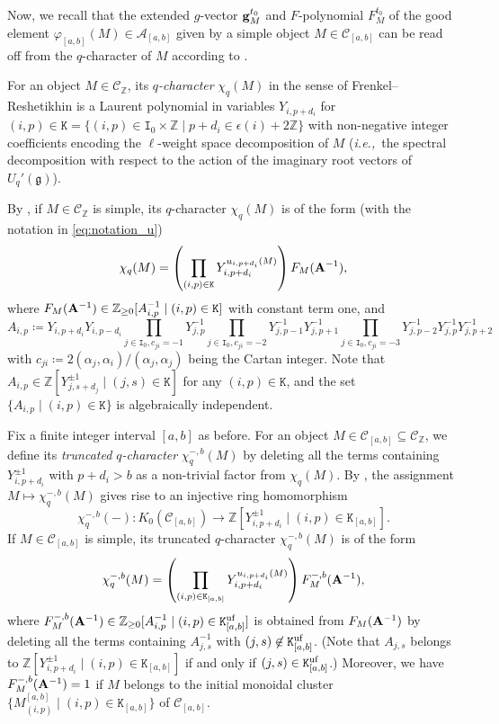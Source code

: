 \documentclass[12pt]{amsart}
\theoremstyle{definition}
\theoremstyle{remark}
\numberwithin{equation}{section}
\newcommand{\ie}{\textit{i.e.,}\ }
\begin{document}
Now, we recall that the extended $g$-vector ${\bf g}_M^{t_0}$ and $F$-polynomial $F_M^{t_0}$ of the good element $\varphi_{[a,b]}(M)\in \mathcal A_{[a,b]}$ given by a simple object $M\in\mathcal{C}_{[a,b]}$ can be read off from the $q$-character of $M$ according to \cite{HL16}.

For an object $M\in\mathcal C_{\mathbb Z}$, its {\em $q$-character} $\chi_q(M)$ in the sense of Frenkel--Reshetikhin \cite{FR99} is a Laurent polynomial in variables $Y_{i,p+d_i}$ for $(i,p)\in \mathtt K=\{(i,p)\in \mathtt{I}_0\times \mathbb Z\mid p+d_i\in \epsilon(i)+2\mathbb{Z}\}$
with non-negative integer coefficients encoding the $\ell$-weight space decomposition of $M$ (\ie the spectral decomposition with respect to the action of the imaginary root vectors of $U_q'(\mathfrak{g})$).

By \cite[Lemma 3.8]{HL16}, if $M \in \mathcal{C}_{\mathbb Z}$ is simple, its $q$-character $\chi_q(M)$ is of the form (with the notation in \eqref{eq:notation_u})
\[ \chi_q(M) = \left( \prod_{(i,p) \in \mathtt K} Y_{i,p+d_i}^{u_{i,p+d_i}(M)} \right) F_M({\bf A}^{-1}),\]
where $F_M({\bf A}^{-1}) \in \mathbb{Z}_{\ge 0}[A_{i,p}^{-1} \mid (i,p) \in \mathtt{K}]$ with constant term one, and
\[ A_{i,p} \coloneqq Y_{i,p+d_i}Y_{i,p-d_i} \prod_{j \in \mathtt{I}_0, c_{ji}=-1} Y_{j,p}^{-1} \prod_{j \in \mathtt{I}_0, c_{ji}=-2} Y_{j,p-1}^{-1}Y_{j,p+1}^{-1} \prod_{j \in \mathtt{I}_0, c_{ji}=-3}Y_{j,p-2}^{-1}Y_{j,p}^{-1}Y_{j,p+2}^{-1}\]
with $c_{ji} \coloneqq 2(\alpha_j,\alpha_i)/(\alpha_j,\alpha_j)$ being the Cartan integer.
Note that $A_{i,p} \in \mathbb Z[Y_{j,s+d_j}^{\pm 1}\mid (j,s)\in \mathtt{K}]$ for any $(i,p)\in \mathtt{K}$, and the set $\{ A_{i,p} \mid (i,p) \in  \mathtt{K}\}$ is algebraically independent.

Fix a finite integer interval $[a,b]$ as before. For an object $M\in \mathcal C_{[a,b]}\subseteq \mathcal {C}_{\mathbb Z}$, we define its {\em truncated $q$-character} $\chi^{-, b}_q(M)$ by deleting all the terms containing $Y_{i,p+d_i}^{\pm 1}$ with $p+d_i > b$ as a non-trivial factor from $\chi_q(M)$. 
By \cite[Proposition 3.10]{HL16},
the assignment $M \mapsto \chi^{-, b}_q(M)$ gives rise to an injective ring homomorphism 
\[ \chi_q^{-, b}(-) \colon {K}_0(\mathcal{C}_{[a,b]}) \to \mathbb{Z}[Y_{i,p+d_i}^{\pm 1} \mid (i,p) \in \mathtt{K}_{[a,b]}].\]
If $M \in \mathcal{C}_{[a,b]}$ is simple, its truncated $q$-character $\chi^{-, b}
_q(M)$ is of the form 
\[ \chi^{-, b}_q(M) = \left( \prod_{(i,p) \in \mathtt K_{[a,b]}} Y_{i,p+d_i}^{u_{i,p+d_i}(M)} \right) F_M^{-, b}({\bf A}^{-1}),\]
where $F_M^{-, b}({\bf A}^{-1}) \in \mathbb{Z}_{\ge 0}[A_{i,p}^{-1} \mid (i,p) \in \mathtt{K}_{[a,b]}^{\rm uf}]$ is obtained from $F_M({\bf A}^{-1})$ by deleting all the terms containing $A_{j,s}^{-1}$ with $(j,s) \not \in \mathtt{K}_{[a,b]}^{\rm uf}$. (Note that $A_{j,s}$ belongs to $\mathbb{Z}[Y_{i,p+d_i}^{\pm 1} \mid (i,p) \in \mathtt{K}_{[a,b]}]$ if and only if $(j,s) \in \mathtt{K}^{\rm uf}_{[a,b]}$.)
Moreover, we have $F^{{-, b}}_{M}({\bf A}^{-1})=1$ if $M$ belongs to  the initial monoidal cluster
    $\{M_{(i,p)}^{[a,b]}\mid (i,p)\in \mathtt{K}_{[a,b]} \}$  of $\mathcal C_{[a,b]}$.
\end{document}
